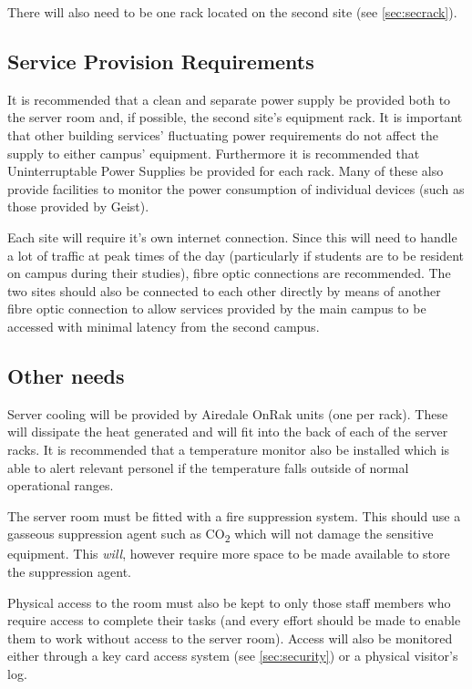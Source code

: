 \documentclass[a4paper, twoside]{article}
\begin{document}
There will also need to be one rack located on the second site (see
\ref{sec:secrack}).

\subsection{Service Provision Requirements}
\label{sec:servicepro}
It is recommended that a clean and separate power supply be provided both to the
server room and, if possible, the second site's equipment rack. It is important
that other building services' fluctuating power requirements do not affect the
supply to either campus' equipment. Furthermore it is recommended that
Uninterruptable Power Supplies be provided for each rack. Many of these also
provide facilities to monitor the power consumption of individual devices (such
as those provided by Geist).

Each site will require it's own internet connection. Since this will need to
handle a lot of traffic at peak times of the day (particularly if students are
to be resident on campus during their studies), fibre optic connections are
recommended. The two sites should also be connected to each other directly by
means of another fibre optic connection to allow services provided by the main
campus to be accessed with minimal latency from the second campus.

\subsection{Other needs}
\label{sec:needs}
Server cooling will be provided by Airedale OnRak units (one per rack). These will dissipate
the heat generated and will fit into the back of each of the server racks. It is
recommended that a temperature monitor also be installed which is able to
alert relevant personel if the temperature falls outside of
normal operational ranges.

The server room must be fitted with a fire suppression system. This should use a
gasseous suppression agent such as CO\textsubscript{2} which will not damage the
sensitive equipment. This \emph{will}, however require more space to be made
available to store the suppression agent\cite{fire}.

Physical access to the room must also be kept to only those staff members who
require access to complete their tasks (and every effort should be made to
enable them to work without access to the server room). Access will also be
monitored either through a key card access system (see \ref{sec:security}) or a
physical visitor's log.
\end{document}
